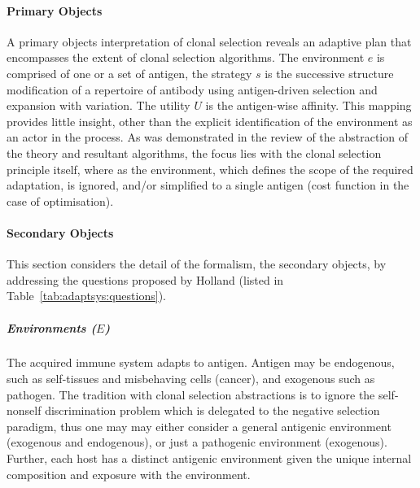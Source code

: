 \paragraph{Primary Objects}
A primary objects interpretation of clonal selection reveals an adaptive plan that encompasses the extent of clonal selection algorithms. The environment $e$ is comprised of one or a set of antigen, the strategy $s$ is the successive structure modification of a repertoire of antibody using antigen-driven selection and expansion with variation. The utility $U$ is the antigen-wise affinity. This mapping provides little insight, other than the explicit identification of the environment as an actor in the process. As was demonstrated in the review of the abstraction of the theory and resultant algorithms, the focus lies with the clonal selection principle itself, where as the environment, which defines the scope of the required adaptation, is ignored, and/or simplified to a single antigen (cost function in the case of optimisation).
%
%
\paragraph{Secondary Objects}
This section considers the detail of the formalism, the secondary objects, by addressing the questions proposed by Holland (listed in Table~\ref{tab:adaptsys:questions}).

\subparagraph{Environments ($E$)} The acquired immune system adapts to antigen. Antigen may be endogenous, such as self-tissues and misbehaving cells (cancer), and exogenous such as pathogen. The tradition with clonal selection abstractions is to ignore the self-nonself discrimination problem which is delegated to the negative selection paradigm, thus one may may either consider a general antigenic environment (exogenous and endogenous), or just a pathogenic environment (exogenous). Further, each host has a distinct antigenic environment given the unique internal composition and exposure with the environment.


